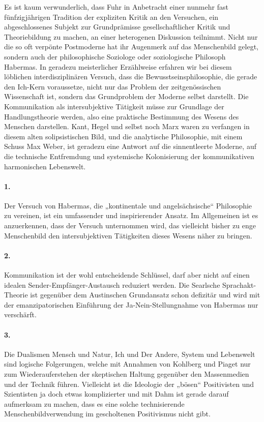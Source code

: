 \documentclass[12pt,a4paper]{article}
\begin{document}
Es ist kaum verwunderlich, dass Fuhr in Anbetracht einer nunmehr fast
fünfzigjährigen Tradition der expliziten Kritik an den Versuchen, ein
abgeschlossenes Subjekt zur Grundprämisse gesellschaftlicher Kritik und
Theoriebildung zu machen, an einer heterogenen Diskussion teilnimmt. Nicht nur
die so oft verpönte Postmoderne hat ihr Augenmerk auf das Menschenbild gelegt,
sondern auch der philosophische Soziologe oder soziologische Philosoph
Habermas. In geradezu meisterlicher Erzählweise erfahren wir bei diesem
löblichen interdisziplinären Versuch, dass die Bewusstseinsphilosophie, die
gerade den Ich-Kern voraussetze, nicht nur das Problem der zeitgenössischen
Wissenschaft ist, sondern das Grundproblem der Moderne selbst darstellt. Die
Kommunikation als intersubjektive Tätigkeit müsse zur Grundlage der
Handlungstheorie werden, also eine praktische Bestimmung des Wesens des
Menschen darstellen. Kant, Hegel und selbst noch Marx waren zu verfangen in
diesem alten solipsistischen Bild, und die analytische Philosophie, mit einem
Schuss Max Weber, ist geradezu eine Antwort auf die sinnentleerte Moderne, auf
die technische Entfremdung und systemische Kolonisierung der kommunikativen
harmonischen Lebenswelt.

\paragraph{1.} 
Der Versuch von Habermas, die „kontinentale und angelsächsische“ Philosophie zu
vereinen, ist ein umfassender und inspirierender Ansatz. Im Allgemeinen ist es
anzuerkennen, dass der Versuch unternommen wird, das vielleicht bisher zu enge
Menschenbild den intersubjektiven Tätigkeiten dieses Wesens näher zu bringen.

\paragraph{2.}
Kommunikation ist der wohl entscheidende Schlüssel, darf aber nicht auf einen
idealen Sender-Empfänger-Austausch reduziert werden. Die Searlsche
Sprachakt-Theorie ist gegenüber dem Austinschen Grundansatz schon defizitär und
wird mit der emanzipatorischen Einführung der Ja-Nein-Stellungnahme von
Habermas nur verschärft.

\paragraph{3.} 
Die Dualismen Mensch und Natur, Ich und Der Andere, System und Lebenswelt sind
logische Folgerungen, welche mit Annahmen von Kohlberg und Piaget nur zum
Wiederauferstehen der skeptischen Haltung gegenüber den Massenmedien und der
Technik führen. Vielleicht ist die Ideologie der „bösen“ Positivisten und
Szientisten ja doch etwas komplizierter und mit Dahm ist gerade darauf
aufmerksam zu machen, dass es eine solche technisierende Menschenbildverwendung
im gescholtenen Positivismus nicht gibt.
\end{document}
